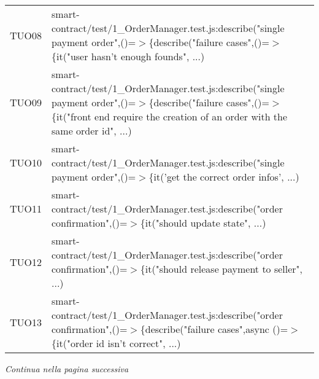 \begin{table}[H]
\begin{tabular}{c|p{15cm}}
    TUO08 & smart-contract/test/1\_OrderManager.test.js:describe("single payment order",\newline()=$>$\{describe("failure cases",()=$>$\{it("user hasn't enough founds", ...)                                         \\
    TUO09 & smart-contract/test/1\_OrderManager.test.js:describe("single payment order",\newline()=$>$\{describe("failure cases",()=$>$\{it("front end require the creation of an order with the same order id", ...)                                \\
    TUO10 & smart-contract/test/1\_OrderManager.test.js:describe("single payment order",\newline()=$>$\{it('get the correct order infos', ...)                                   \\
    TUO11 & smart-contract/test/1\_OrderManager.test.js:describe("order confirmation",\newline()=$>$\{it("should update state", ...)                                                          \\
    TUO12 & smart-contract/test/1\_OrderManager.test.js:describe("order confirmation",\newline()=$>$\{it("should release payment to seller", ...)                                       \\                                                      
    TUO13 & smart-contract/test/1\_OrderManager.test.js:describe("order confirmation",\newline()=$>$\{describe("failure cases",async ()=$>$\{it("order id isn't correct", ...)                                                          \\
  \end{tabular}
\end{table}
\begin{center}
  \textit{\small Continua nella pagina successiva}
\end{center}
